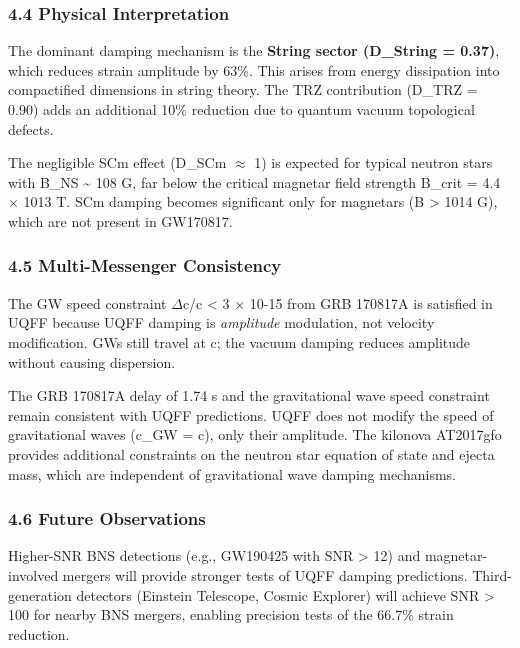 \documentclass[
  11pt,
]{article}
\begin{document}
\subsubsection{4.4 Physical
Interpretation}\label{physical-interpretation}

The dominant damping mechanism is the \textbf{String sector (D\_String =
0.37)}, which reduces strain amplitude by 63\%. This arises from energy
dissipation into compactified dimensions in string theory. The TRZ
contribution (D\_TRZ = 0.90) adds an additional 10\% reduction due to
quantum vacuum topological defects.

The negligible SCm effect (D\_SCm $\approx$ 1) is expected for typical
neutron stars with B\_NS \textasciitilde{} 108 G, far below the critical
magnetar field strength B\_crit = 4.4 $\times$ 1013 T. SCm damping
becomes significant only for magnetars (B \textgreater{} 1014 G), which
are not present in GW170817.

\subsubsection{4.5 Multi-Messenger
Consistency}\label{multi-messenger-consistency}

The GW speed constraint \textbar{}$\Delta$c/c\textbar{} \textless{} 3
$\times$ 10-15 from GRB 170817A is satisfied in UQFF because UQFF
damping is \emph{amplitude} modulation, not velocity modification. GWs
still travel at c; the vacuum damping reduces amplitude without causing
dispersion.

The GRB 170817A delay of 1.74 s and the gravitational wave speed
constraint remain consistent with UQFF predictions. UQFF does not modify
the speed of gravitational waves (c\_GW = c), only their amplitude. The
kilonova AT2017gfo provides additional constraints on the neutron star
equation of state and ejecta mass, which are independent of
gravitational wave damping mechanisms.

\subsubsection{4.6 Future Observations}\label{future-observations}

Higher-SNR BNS detections (e.g., GW190425 with SNR \textgreater{} 12)
and magnetar-involved mergers will provide stronger tests of UQFF
damping predictions. Third-generation detectors (Einstein Telescope,
Cosmic Explorer) will achieve SNR \textgreater{} 100 for nearby BNS
mergers, enabling precision tests of the 66.7\% strain reduction.
\end{document}
